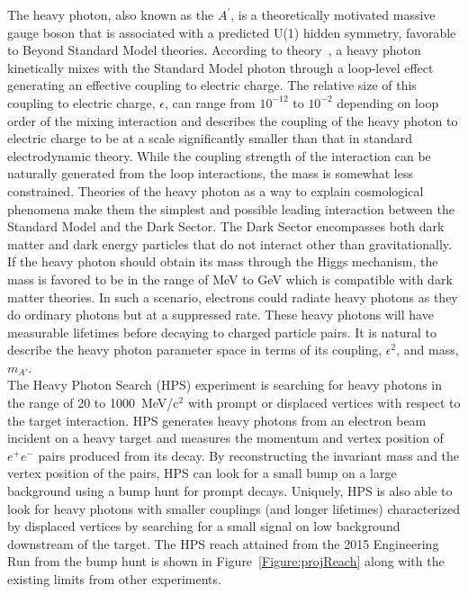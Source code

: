 The heavy photon, also known as the $A^{\prime}$, is a theoretically motivated massive gauge boson that is associated with a predicted U(1) hidden symmetry, favorable to Beyond Standard Model theories. According to theory~\cite{holdom_two_1986}, a heavy photon kinetically mixes with the Standard Model photon through a loop-level effect generating an effective coupling to electric charge. The relative size of this coupling to electric charge, $\epsilon$, can range from $10^{-12}$ to $10^{-2}$ depending on loop order of the mixing interaction and describes the coupling of the heavy photon to electric charge to be at a scale significantly smaller than that in standard electrodynamic theory. While the coupling strength of the interaction can be naturally generated from the loop interactions, the mass is somewhat less constrained. Theories of the heavy photon as a way to explain cosmological phenomena make them the simplest and possible leading interaction between the Standard Model and the Dark Sector. The Dark Sector encompasses both dark matter and dark energy particles that do not interact other than gravitationally. If the heavy photon should obtain its mass through the Higgs mechanism, the mass is favored to be in the range of MeV to GeV which is compatible with dark matter theories. In such a scenario, electrons could radiate heavy photons as they do ordinary photons but at a suppressed rate. These heavy photons will have measurable lifetimes before decaying to charged particle pairs. It is natural to describe the heavy photon parameter space in terms of its coupling, $\epsilon^2$, and mass, $m_{A'}$.\\
\indent The Heavy Photon Search (HPS) experiment is searching for heavy photons in the range of 20 to 1000~MeV/c$^2$ with prompt or displaced vertices with respect to the target interaction. HPS  generates heavy photons from an electron beam incident on a heavy target and measures the momentum and vertex position of $e^+e^-$ pairs produced from its decay. By reconstructing the invariant mass and the vertex position of the pairs, HPS can look for a small bump on a large background using a bump hunt for prompt decays. Uniquely, HPS is also able to look for heavy photons with smaller couplings (and longer lifetimes) characterized by displaced vertices by searching for a small signal on low background downstream of the target. The HPS reach attained from the 2015 Engineering Run from the bump hunt is shown in Figure~\ref{Figure:projReach} along with the existing limits from other experiments.
